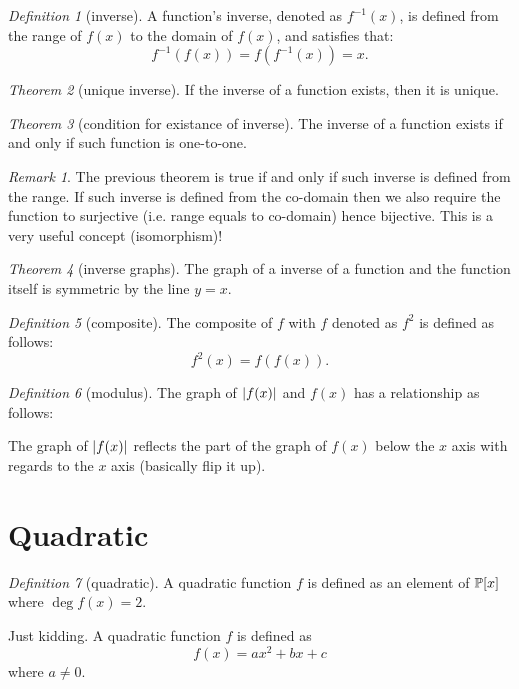 \documentclass[8pt]{article}
\theoremstyle{remark}
\newtheorem{theorem}{Theorem}[section]
\newtheorem{definition}[theorem]{Definition}
\newtheorem*{remark}{Remark}
\begin{document}
        \begin{definition}[inverse]
            A function's inverse, denoted as $f^{-1}(x)$, is defined from the range of $f(x)$ to the domain of $f(x)$, and satisfies that:
            $$
                f^{-1}(f(x)) = f(f^{-1}(x))= x.
            $$
        \end{definition}

        \begin{theorem}[unique inverse]
            If the inverse of a function exists, then it is unique.
        \end{theorem}

        \begin{theorem}[condition for existance of inverse]
            The inverse of a function exists if and only if such function is one-to-one.
        \end{theorem}

        \begin{remark}
            The previous theorem is true if and only if such inverse is defined from the range. If such inverse is defined from the co-domain then we also require the function to surjective (i.e. range equals to co-domain) hence bijective. This is a very useful concept (isomorphism)!
        \end{remark}

        \begin{theorem}[inverse graphs]
            The graph of a inverse of a function and the function itself is symmetric by the line $y = x$.
        \end{theorem}

        \begin{definition}[composite]
            The composite of $f$ with $f$ denoted as $f^2$ is defined as follows:
            $$
            f^2(x) = f(f(x)).
            $$
        \end{definition}

        \begin{definition}[modulus]
            The graph of $\left\lvert f(x) \right\rvert$ and $f(x)$ has a relationship as follows:

            The graph of $\left\lvert f(x) \right\rvert$ reflects the part of the graph of $f(x)$ below the $x$ axis with regards to the $x$ axis (basically flip it up).
        \end{definition}

    \section{Quadratic}
        \begin{definition}[quadratic]
            A quadratic function $f$ is defined as an element of $\mathbb{P}[x]$ where $\deg f(x) = 2$.

            Just kidding. A quadratic function $f$ is defined as
            $$
            f(x) = ax^2 + bx + c
            $$
            where $a \neq 0$.
        \end{definition}
\end{document}
